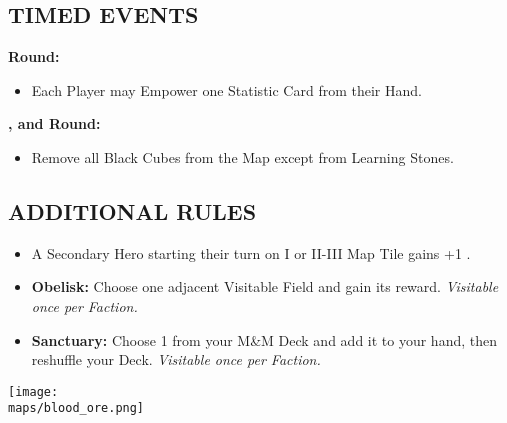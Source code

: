 \begin{multicols*}{2}
\subsection*{\MakeUppercase{Timed Events}}
\textbf{ Round:}
\begin{itemize}
  \item Each Player may Empower one Statistic Card from their Hand.
\end{itemize}
\textbf{,  and  Round:}
\begin{itemize}
  \item Remove all Black Cubes from the Map except from Learning Stones.
\end{itemize}
\subsection*{\MakeUppercase{Additional Rules}}
\begin{itemize}
  \item A Secondary Hero starting their turn on I or II-III Map Tile gains +1 .
  \item \textbf{Obelisk:} Choose one adjacent Visitable Field and gain its reward. \textit{Visitable once per Faction.}
  \item \textbf{Sanctuary:} Choose 1  from your M\&M Deck and add it to your hand, then reshuffle your Deck. \textit{Visitable once per Faction.}
\end{itemize}

\begin{center}
  \vfill
  \texttt{[image: \\maps/blood\_ore.png]}
  \vfill
\end{center}

\end{multicols*}
